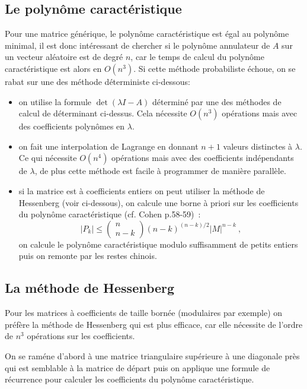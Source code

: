 \documentclass[a4paper,11pt]{book}
\begin{document}
\begin{giacjshere}
\subsection{Le polyn\^ome caract\'eristique}
Pour une matrice générique, le polynôme caractéristique est égal
au polynôme minimal, il est donc intéressant de chercher si le polynôme
annulateur de $A$ sur un vecteur aléatoire est de degré $n$, 
car le temps de calcul du polynôme caractéristique est alors en $O(n^3)$. 
Si cette méthode probabiliste échoue, on se
rabat sur une des méthode déterministe ci-dessous:
\begin{itemize}
\item on utilise la formule $\det(\lambda I -A)$ déterminé par
une des m\'ethodes de calcul de d\'eterminant ci-dessus. Cela
nécessite $O(n^3)$ opérations mais avec des coefficients 
polynômes en $\lambda$.
\item on fait une interpolation de Lagrange en donnant $n+1$ valeurs
distinctes \`a $\lambda$. Ce qui nécessite $O(n^4)$ opérations mais avec
des coefficients indépendants de $\lambda$, de plus cette m\'ethode 
est facile \`a programmer de mani\`ere parall\`ele.
\item si la matrice est \`a coefficients entiers
on peut utiliser la m\'ethode de Hessenberg (voir ci-dessous), on calcule
une borne \`a priori sur les coefficients du polyn\^ome caract\'eristique
(cf. Cohen p.58-59)~:
\[ |P_k| \leq \left( \begin{array}{c} n \\ n-k\end{array}\right) 
(n-k)^{(n-k)/2} |M|^{n-k} \ ,\]
on calcule le polyn\^ome caract\'eristique modulo suffisamment
de petits entiers puis on remonte par les restes chinois.
\end{itemize}

\subsection{La m\'ethode de Hessenberg}
Pour les matrices \`a coefficients de taille born\'ee (modulaires par exemple)
on préfère la m\'ethode de Hessenberg qui est plus
efficace, car elle n\'ecessite de l'ordre de $n^3$ op\'erations sur
les coefficients.

On se ram\'ene d'abord \`a une matrice triangulaire supérieure à
une diagonale près qui est semblable \`a la
matrice de d\'epart puis on
applique une formule de r\'ecurrence pour calculer les coefficients
du polyn\^ome caract\'eristique.


\end{giacjshere}
\end{document}

